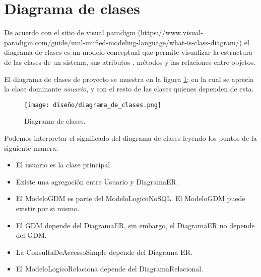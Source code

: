 \section{Diagrama de clases}

De acuerdo con el sitio de visual paradigm (https://www.visual-paradigm.com/guide/uml-unified-modeling-language/what-is-class-diagram/) el diagrama de clases es un modelo conceptual que permite visualizar la estructura de las clases de un sistema, sus atributos , métodos  y las relaciones entre objetos.


El diagrama de clases de proyecto se muestra en la figura \ref{img:classes_diagram}; en la cual se aprecia la clase dominante \textit{usuario}, y son el resto de las clases quienes dependen de esta.


\begin{figure}[H]
  \centering
  \texttt{[image: diseño/diagrama\_de\_clases.png]}
  \caption{Diagrama de clases.}
  \label{img:classes_diagram}
\end{figure}

Podemos interpretar el significado del diagrama de clases leyendo los puntos de la siguiente manera:

\begin{itemize}
  \item El usuario es la clase principal.
  \item Existe una agregación entre Usuario y DiagramaER.
  \item El ModeloGDM es parte del ModeloLogicoNoSQL. El ModeloGDM puede existir por si mismo.
  \item El GDM depende del DiagramaER, sin embargo, el DiagramaER no depende del GDM.
  \item La ConsultaDeAccessoSimple depende del Diagrama ER.
  \item El ModeloLogicoRelaciona depende del DiagramaRelacional.
\end{itemize}


